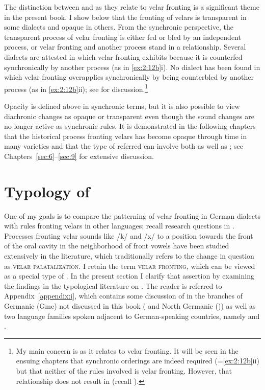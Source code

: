 \begin{xlist}
\begin{xlist}
The distinction between  and  as they relate to velar fronting is a significant theme in the present book. I show below that the fronting of velars is transparent in some dialects and opaque in others. From the synchronic perspective, the transparent process of velar fronting is either fed or bled by an independent process, or velar fronting and another process stand in a  relationship. Several dialects are attested in which velar fronting exhibits  because it is counterfed synchronically by another process (as in \ref{ex:2:12b}i). No dialect has been found in which velar fronting overapplies synchronically by being counterbled by another process (as in \ref{ex:2:12b}ii); see  for discussion.\footnote{My main concern is  as it relates to velar fronting. It will be seen in the ensuing chapters that synchronic  orderings are indeed required (=\ref{ex:2:12b}ii) but that neither of the rules involved is velar fronting. However, that  relationship does not result in  (recall ).}

Opacity is defined above in synchronic terms, but it is also possible to view diachronic changes as opaque or transparent even though the sound changes are no longer active as synchronic rules. It is demonstrated in the following chapters that the historical process fronting velars has become opaque through time in many varieties and that the type of  referred can involve both  as well as ; see Chapters~\ref{sec:6}--\ref{sec:9} for extensive discussion.

\section{Typology of }\label{sec:2.3}

One of my goals is to compare the patterning of velar fronting in German dialects with rules fronting velars in other languages; recall research questions  in . Processes fronting velar sounds like /k/ and /x/ to a position towards the front of the oral cavity in the neighborhood of front vowels have been studied extensively in the literature, which traditionally refers to the change in question as \textsc{velar} \textsc{palatalization}. I retain the term \textsc{velar} \textsc{fronting}, which can be viewed as a special type of . In the present section I clarify that assertion by examining the findings in the typological literature on . The reader is referred to Appendix~\ref{appendix:i}, which contains some discussion of  in the branches of Germanic (Gmc) not discussed in this book ( and North Germanic ()) as well as two language families spoken adjacent to German-speaking countries, namely  and .


\end{xlist}
\end{xlist}

